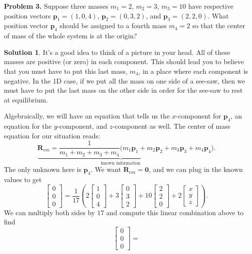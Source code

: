 \documentclass[12pt]{report} %
\theoremstyle{definition}
\newtheorem{solution}{Solution}
\begin{document}
\noindent\textbf{Problem 3.} Suppose three masses $m_1 = 2$, $m_2 = 3$, $m_3 = 10$ have respective position vectors $\textbf{p}_1 = (1,0,4)$, $\textbf{p}_2 = (0,3,2)$, and $\textbf{p}_3 = (2,2,0)$. What position vector $\textbf{p}_4$ should be assigned to a fourth mass $m_4 = 2$ so that the center of mass of the whole system is at the origin?
\begin{solution}
It's a good idea to think of a picture in your head. All of these masses are positive (or zero) in each component. This should lead you to believe that you must have to put this last mass, $m_4$, in a place where each component is negative.  In the 1D case, if we put all the mass on one side of a see-saw, then we must have to put the last mass on the other side in order for the see-saw to rest at equilibrium.

Algebraically, we will have an equation that tells us the $x$-component for $\mathbf{p}_4$, an equation for the $y$-component, and $z$-component as well.  The center of mass equation for our situation reads:
\[
\underbrace{\mathbf{R}_{cm}=\frac{1}{m_1+m_2+m_3+m_4}(m_1\mathbf{p}_1+m_2\mathbf{p}_2+m_3\mathbf{p}_3+m_4}_{\textrm{known information}}\mathbf{p}_4).
\]
The only unknown here is $\mathbf{p}_4$. We want $\mathbf{R}_{cm}=\mathbf{0}$, and we can plug in the known values to get
\[
\begin{bmatrix} 0\\ 0\\ 0\end{bmatrix}
= \frac{1}{17}\left(2
\begin{bmatrix} 1\\ 0\\ 4\end{bmatrix}+
3\begin{bmatrix} 0\\ 3\\ 2\end{bmatrix}+
10\begin{bmatrix} 2\\ 2\\ 0\end{bmatrix}+
2\begin{bmatrix} x\\ y\\ z\end{bmatrix}\right).
\]
We can multiply both sides by $17$ and compute this linear combination above to find
\[
\begin{bmatrix} 0\\ 0\\ 0 \end{bmatrix}=
\]
\end{solution}
\end{document}
